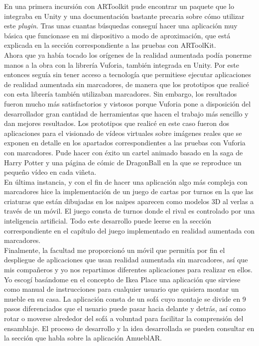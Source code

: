 En una primera incursión con ARToolkit pude encontrar un paquete que lo integraba en Unity y una documentación bastante precaria sobre cómo utilizar este \textit{plugin}. Tras unas cuantas búsquedas conseguí hacer una aplicación muy básica que funcionase en mi dispositivo a modo de aproximación, que está explicada en la sección correspondiente a las pruebas con ARToolKit.\\

Ahora que ya había tocado los orígenes de la realidad aumentada podía ponerme manos a la obra con la librería
Vuforia, también integrada en Unity. Por este entonces seguía sin tener acceso a tecnología que permitiese ejecutar aplicaciones de realidad aumentada sin marcadores, de manera que los prototipos que realicé con esta librería también utilizaban marcadores. Sin embargo, los resultados fueron mucho más satisfactorios y vistosos porque Vuforia pone a disposición del desarrollador gran cantidad de herramientas que hacen el trabajo más sencillo y dan mejores resultados. Los prototipos que realicé en este caso fueron dos aplicaciones para el visionado de vídeos virtuales sobre imágenes reales que se exponen en detalle en los apartados correspondientes a las pruebas con Vuforia con marcadores. Pude hacer con éxito un cartel animado basado en la saga de Harry Potter y una página de cómic de DragonBall en la que se reproduce un pequeño vídeo en cada viñeta.\\

En última instancia, y con el fin de hacer una aplicación algo más compleja con marcadores hice la implementación de un juego de cartas por turnos en la que las criaturas que están dibujadas en los naipes aparecen como modelos 3D al verlas a través de un móvil. El juego consta de turnos donde el rival es controlado por una inteligencia artificial. Todo este desarrollo puede leerse en la sección correspondiente en el capítulo del juego implementado en realidad aumentada con marcadores.\\

Finalmente, la facultad me proporcionó un móvil que permitía por fin el despliegue de aplicaciones que usan realidad aumentada sin marcadores, así que mis compañeros y yo nos repartimos diferentes aplicaciones para realizar en ellos. Yo escogí basándome en el concepto de Ikea Place una aplicación que sirviese como manual de instrucciones para cualquier usuario que quisiera montar un mueble en su casa. La aplicación consta de un sofá cuyo montaje se divide en 9 pasos diferenciados que el usuario puede pasar hacia delante y detrás, así como rotar o moverse alrededor del sofá a voluntad para facilitar la comprensión del ensamblaje. El proceso de desarrollo y la idea desarrollada se pueden consultar en la sección que habla sobre la aplicación AmueblAR.\\

